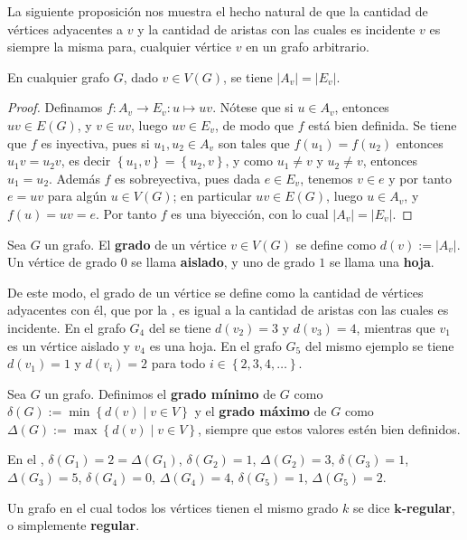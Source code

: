 La siguiente proposición nos muestra el hecho natural de que la cantidad de vértices adyacentes a $v$ y la cantidad de aristas con las cuales es incidente $v$ es siempre la misma para, cualquier vértice $v$ en un grafo arbitrario.
\begin{Prop} \label{Prop:AvEv}
   En cualquier grafo $G$, dado $v\in V(G)$, se tiene $|A_v|=|E_v|$.
\end{Prop}
\begin{proof}
Definamos $f:A_v\to E_v: u\mapsto uv$. Nótese que si $u\in A_v$, entonces $uv\in E(G)$, y $v\in uv$, luego $uv\in E_v$, de modo que $f$ está bien definida. Se tiene que $f$ es inyectiva, pues si $u_1,u_2 \in A_v$ son tales que $f(u_1)=f(u_2)$ entonces $u_1v=u_2v$, es decir $\left\lbrace u_1,v\right\rbrace=\left\lbrace u_2,v\right\rbrace$, y como $u_1\neq v$ y $u_2\neq v$, entonces $u_1=u_2$. Además $f$ es sobreyectiva, pues dada $e\in E_v$, tenemos $v\in e$ y por tanto $e=uv$ para algún $u\in V(G)$; en particular $uv\in E(G)$, luego $u\in A_v$, y $f(u)=uv=e$. Por tanto $f$ es una biyección, con lo cual $|A_v|=|E_v|$.
\end{proof}
\begin{Def}
   Sea $G$ un grafo. El \textbf{grado} de un vértice $v\in V(G)$ se define como $d(v):=|A_v|$. Un vértice de grado $0$ se llama \textbf{aislado}, y uno de grado $1$ se llama una \textbf{hoja}.
\end{Def}
De este modo, el grado de un vértice se define como la cantidad de vértices adyacentes con él, que por la , es igual a la cantidad de aristas con las cuales es incidente. En el grafo $G_4$ del  se tiene $d(v_2)=3$ y $d(v_3)=4$, mientras que $v_1$ es un vértice aislado y $v_4$ es una hoja. En el grafo $G_5$ del mismo ejemplo se tiene $d(v_1)=1$ y $d(v_i)=2$ para todo $i\in \left\lbrace 2,3,4,\dots \right\rbrace$.
\begin{Def}
   Sea $G$ un grafo. Definimos el \textbf{grado mínimo} de $G$ como $\delta (G):= \min \left\lbrace d(v)\mid v\in V\right\rbrace$ y el \textbf{grado máximo} de $G$ como $\Delta (G):= \max \left\lbrace d(v)\mid v\in V\right\rbrace$, siempre que estos valores estén bien definidos.
\end{Def}
En el , $\delta (G_1)=2=\Delta (G_1)$, $\delta (G_2)=1$, $\Delta (G_2)=3$, $\delta (G_3)=1$, $\Delta (G_3)=5$, $\delta (G_4)=0$, $\Delta (G_4)=4$, $\delta (G_5)=1$, $\Delta (G_5)=2$.
\begin{Def}
   Un grafo en el cual todos los vértices tienen el mismo grado $k$ se dice $\boldsymbol{k}$\textbf{-regular}, o simplemente \textbf{regular}.
\end{Def}
